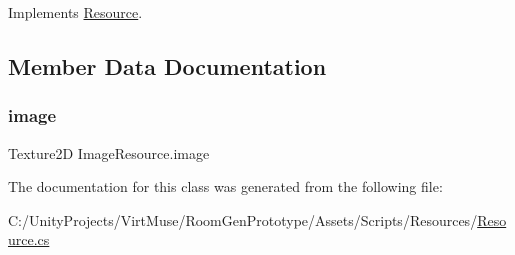 Implements \mbox{\hyperlink{class_resource_a2461ea96169926a858f02ebaf94157fb}{Resource}}.



\subsection{Member Data Documentation}
\mbox{\label{class_image_resource_ad70b80d140f4bdaa54743a40263ede33}} 
\subsubsection{\texorpdfstring{image}{image}}
{\footnotesize\ttfamily Texture2D Image\+Resource.\+image\hspace{0.3cm}{\ttfamily [private]}}



The documentation for this class was generated from the following file\+:\begin{DoxyCompactItemize}
\item 
C\+:/\+Unity\+Projects/\+Virt\+Muse/\+Room\+Gen\+Prototype/\+Assets/\+Scripts/\+Resources/\mbox{\hyperlink{_resource_8cs}{Resource.\+cs}}\end{DoxyCompactItemize}
